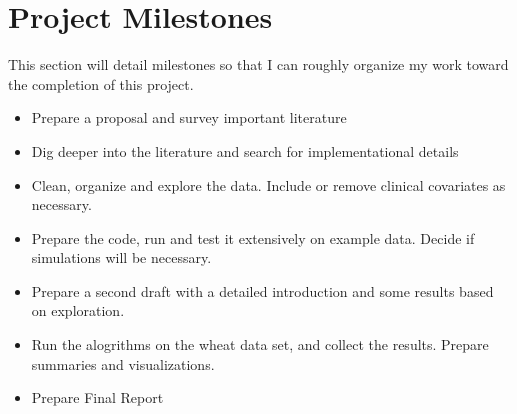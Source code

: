 \documentclass{sig-alternate-05-2015}
\begin{document}
\section{Project Milestones}
This section will detail milestones so that I can roughly organize my work
toward the completion of this project.
\begin{itemize}
\item Prepare a proposal and survey important literature
\item Dig deeper into the literature and search for implementational details
\item Clean, organize and explore the data. Include or remove clinical covariates as necessary.
\item Prepare the code, run and test it extensively on example data. Decide if simulations will be necessary.
\item Prepare a second draft with a detailed introduction and some results based on exploration.
\item Run the alogrithms on the wheat data set, and collect the results. Prepare summaries and visualizations.
\item Prepare Final Report
\end{itemize}



\end{document}
